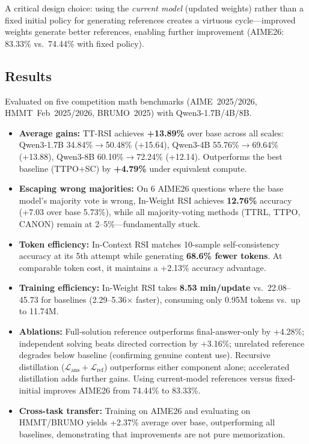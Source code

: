 \documentclass[11pt,a4paper]{article}
\begin{document}
A critical design choice: using the \emph{current model} (updated weights) rather than a fixed initial policy for generating references creates a virtuous cycle---improved weights generate better references, enabling further improvement (AIME26: 83.33\% vs.\ 74.44\% with fixed policy).

\subsection{Results}
Evaluated on five competition math benchmarks (AIME~2025/2026, HMMT~Feb~2025/2026, BRUMO~2025) with Qwen3-1.7B/4B/8B.

\begin{itemize}
  \item \textbf{Average gains:} TT-RSI achieves \textbf{+13.89\%} over base across all scales: Qwen3-1.7B 34.84\%$\rightarrow$50.48\% (+15.64), Qwen3-4B 55.76\%$\rightarrow$69.64\% (+13.88), Qwen3-8B 60.10\%$\rightarrow$72.24\% (+12.14). Outperforms the best baseline (TTPO+SC) by \textbf{+4.79\%} under equivalent compute.
  \item \textbf{Escaping wrong majorities:} On 6 AIME26 questions where the base model's majority vote is wrong, In-Weight RSI achieves \textbf{12.76\%} accuracy (+7.03 over base 5.73\%), while all majority-voting methods (TTRL, TTPO, CANON) remain at 2--5\%---fundamentally stuck.
  \item \textbf{Token efficiency:} In-Context RSI matches 10-sample self-consistency accuracy at its 5th attempt while generating \textbf{68.6\% fewer tokens}. At comparable token cost, it maintains a +2.13\% accuracy advantage.
  \item \textbf{Training efficiency:} In-Weight RSI takes \textbf{8.53 min/update} vs.\ 22.08--45.73 for baselines (2.29--5.36$\times$ faster), consuming only 0.95M tokens vs.\ up to 11.74M.
  \item \textbf{Ablations:} Full-solution reference outperforms final-answer-only by +4.28\%; independent solving beats directed correction by +3.16\%; unrelated reference degrades below baseline (confirming genuine content use). Recursive distillation ($\mathcal{L}_{\text{ans}} + \mathcal{L}_{\text{ref}}$) outperforms either component alone; accelerated distillation adds further gains. Using current-model references versus fixed-initial improves AIME26 from 74.44\% to 83.33\%.
  \item \textbf{Cross-task transfer:} Training on AIME26 and evaluating on HMMT/BRUMO yields +2.37\% average over base, outperforming all baselines, demonstrating that improvements are not pure memorization.
\end{itemize}
\end{document}
